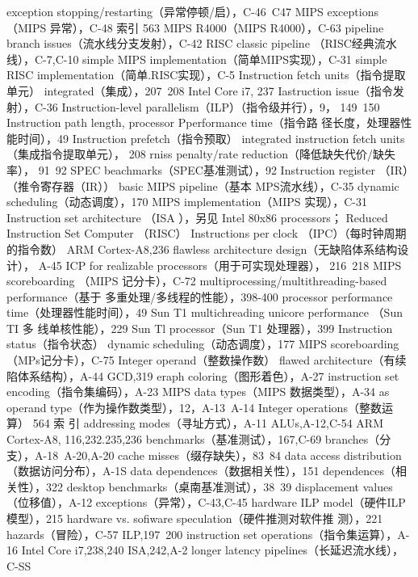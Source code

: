 exception stopping/restarting（异常停顿/启），C-46~C47
MIPS exceptions（MIPS 异常），C-48
索引
563
MIPS R4000（MIPS R4000），C-63
pipeline branch issues（流水线分支发射），C-42
RISC classic pipeline （RISC经典流水线），C-7,C-10
simple MIPS implementation（简单MIPS实现），C-31
simple RISC implementation（简单.RISC实现），C-5
Instruction fetch units（指令提取单元）
integrated（集成），207~208
Intel Core i7, 237
Iastruction issue（指令发射），C-36
Instruction-level parallelism（ILP）（指令级并行），9，
149~150
Instruction path length, processor Pperformance time（指令路
径长度，处理器性能时间），49
Instruction prefetch（指令预取）
integrated instruction fetch units（集成指令提取单元），
208
rniss penalty/rate reduction（降低缺失代价/缺失率），
91~92
SPEC beachmarks（SPEC基准测试），92
Instruction register （IR）（推令寄存器（IR））
basic MIPS pipeline（基本 MPS流水线），C-35
dynamic scheduling（动态调度），170
MIPS implementation（MIPS 实现），C-31
Instruction set architecture （ISA ），另见 Intel 80x86 processors；
Reduced Instruction Set Computer （RISC）
Instructions per clock （IPC）（每时钟周期的指令数）
ARM Cortex-A8,236
flawless architecture design（无缺陷体系结构设计），
A-45
ICP for realizable processors（用于可实现处理器），
216~218
MIPS scoreboarding （MIPS 记分卡），C-72
multiprocessing/multithreading-based performance（基于
多重处理/多线程的性能），398-400
processor performance time（处理器性能时间），49
Sun T1 multichreading unicore performance （Sun TI 多
线单核性能），229
Sun Tl processor（Sun T1 处理器），399
Instruction status（指令状态）
dynamic scheduling（动态调度），177
MIPS scoreboarding（MPs记分卡），C-75
Integer operand（整数操作数）
flawed architecture（有续陷体系结构），A-44
GCD,319
eraph coloring（图形着色），A-27
instruction set encoding（指令集编码），A-23
MIPS data types（MIPS 数据类型），A-34
as operand type（作为操作数类型），12，A-13~A-14
Integer operations（整数运算）
564
索
引
addressing modes（寻址方式），A-11
ALUs,A-12,C-54
ARM Cortex-A8, 116,232.235,236
benchmarks（基准测试），167,C-69
branches（分支），A-18~A-20,A-20
cache misses（缀存缺失），83~84
data access distribution（数据访问分布），A-1S
data dependences（数据相关性），151
dependences（相关性），322
desktop benchmarks（桌南基准测试），38~39
displacement values（位移值），A-12
exceptions（异常），C-43,C-45
hardware ILP model（硬件ILP模型），215
hardware vs. sofiware speculation（硬件推测对软件推
测），221
hazards（冒险），C-57
ILP,197~200
instruction set operations（指令集运算），A-16
Intel Core i7,238,240
ISA,242,A-2
longer latency pipelines（长延迟流水线），C-SS
